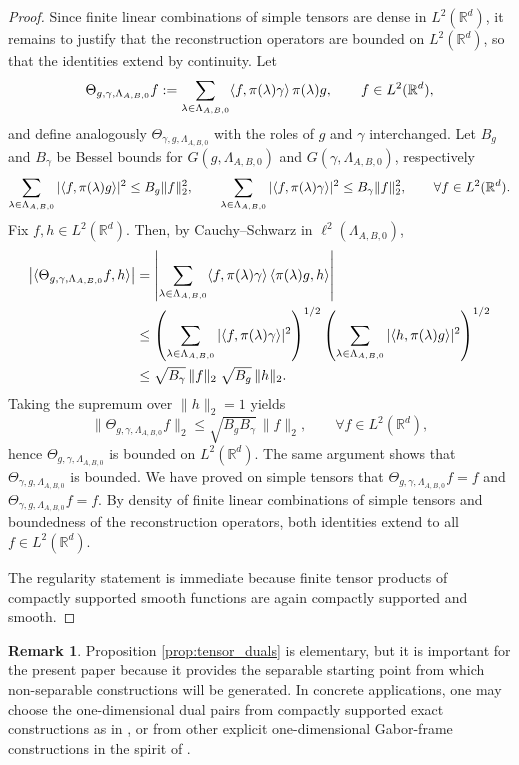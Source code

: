 \documentclass[final,1p,times,authoryear]{elsarticle}
\theoremstyle{definition}
\newtheorem{remark}[theorem]{Remark}
\newcommand{\R}{\mathbb{R}}
\newcommand{\1}{\mathbf{1}}
\DeclarePairedDelimiter{\inner}{\langle}{\rangle}
\begin{document}
\begin{proof}
Since finite linear combinations of simple tensors are dense in $L^2(\R^d)$, it remains to justify
that the reconstruction operators are bounded on $L^2(\R^d)$, so that the identities extend by continuity.
Let
$$
\Theta_{g,\gamma,\Lambda_{A,B,0}}f
:=
\sum_{\lambda\in\Lambda_{A,B,0}}\inner{f,\pi(\lambda)\gamma}\,\pi(\lambda)g,
\qquad f\in L^2(\R^d),
$$
and define analogously $\Theta_{\gamma,g,\Lambda_{A,B,0}}$ with the roles of $g$ and $\gamma$ interchanged.
{Let $B_g$ and $B_\gamma$ be Bessel bounds for
$G(g,\Lambda_{A,B,0})$ and $G(\gamma,\Lambda_{A,B,0})$},
respectively
$$
\sum_{\lambda\in\Lambda_{A,B,0}}|\inner{f,\pi(\lambda)g}|^2\le B_g\|f\|_2^2,
\qquad
\sum_{\lambda\in\Lambda_{A,B,0}}|\inner{f,\pi(\lambda)\gamma}|^2\le B_\gamma\|f\|_2^2,
\qquad \forall f\in L^2(\R^d).
$$
Fix $f,h\in L^2(\R^d)$. Then, by Cauchy--Schwarz in $\ell^2(\Lambda_{A,B,0})$,
\begin{align*}
\big|\inner{\Theta_{g,\gamma,\Lambda_{A,B,0}}f,h}\big|
&=
\left|\sum_{\lambda\in\Lambda_{A,B,0}}\inner{f,\pi(\lambda)\gamma}\,\inner{\pi(\lambda)g,h}\right|\\
&\le
\left(\sum_{\lambda\in\Lambda_{A,B,0}}|\inner{f,\pi(\lambda)\gamma}|^2\right)^{1/2}
\left(\sum_{\lambda\in\Lambda_{A,B,0}}|\inner{h,\pi(\lambda)g}|^2\right)^{1/2}\\
&\le
\sqrt{B_\gamma}\,\|f\|_2\;\sqrt{B_g}\,\|h\|_2.
\end{align*}
Taking the supremum over $\|h\|_2=1$ yields
$$
\|\Theta_{g,\gamma,\Lambda_{A,B,0}}f\|_2\le \sqrt{B_gB_\gamma}\,\|f\|_2,
\qquad \forall f\in L^2(\R^d),
$$
hence $\Theta_{g,\gamma,\Lambda_{A,B,0}}$ is bounded on $L^2(\R^d)$. The same argument shows that
$\Theta_{\gamma,g,\Lambda_{A,B,0}}$ is bounded. We have proved on simple tensors that $\Theta_{g,\gamma,\Lambda_{A,B,0}}f=f$ and
$\Theta_{\gamma,g,\Lambda_{A,B,0}}f=f$. By density of finite linear combinations of simple tensors and
boundedness of the reconstruction operators, both identities extend to all $f\in L^2(\R^d)$.

The regularity statement is immediate because finite tensor products of compactly supported
smooth functions are again compactly supported and smooth.
\end{proof}

\begin{remark}
Proposition \ref{prop:tensor_duals} is elementary, but it is important for the present paper because it provides the separable starting point from which non-separable constructions will be generated. In concrete applications, one may choose the one-dimensional dual pairs from compactly supported exact constructions as in \citep{Sto22}, or from other explicit one-dimensional Gabor-frame constructions in the spirit of \citep{DGM86}.
\end{remark}
\end{document}
